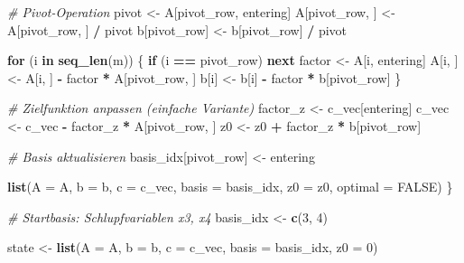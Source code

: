 \documentclass[
]{article}
\newenvironment{Shaded}{\begin{snugshade}}{\end{snugshade}}
\newcommand{\AttributeTok}[1]{\textcolor[rgb]{0.13,0.29,0.53}{#1}}
\newcommand{\CommentTok}[1]{\textcolor[rgb]{0.56,0.35,0.01}{\textit{#1}}}
\newcommand{\ConstantTok}[1]{\textcolor[rgb]{0.56,0.35,0.01}{#1}}
\newcommand{\ControlFlowTok}[1]{\textcolor[rgb]{0.13,0.29,0.53}{\textbf{#1}}}
\newcommand{\DecValTok}[1]{\textcolor[rgb]{0.00,0.00,0.81}{#1}}
\newcommand{\FunctionTok}[1]{\textcolor[rgb]{0.13,0.29,0.53}{\textbf{#1}}}
\newcommand{\NormalTok}[1]{#1}
\newcommand{\OtherTok}[1]{\textcolor[rgb]{0.56,0.35,0.01}{#1}}
\newcommand{\SpecialCharTok}[1]{\textcolor[rgb]{0.81,0.36,0.00}{\textbf{#1}}}
\begin{document}
\begin{Shaded}
\begin{Highlighting}[]
  \CommentTok{\# Pivot{-}Operation}
\NormalTok{  pivot }\OtherTok{\textless{}{-}}\NormalTok{ A[pivot\_row, entering]}
\NormalTok{  A[pivot\_row, ] }\OtherTok{\textless{}{-}}\NormalTok{ A[pivot\_row, ] }\SpecialCharTok{/}\NormalTok{ pivot}
\NormalTok{  b[pivot\_row]   }\OtherTok{\textless{}{-}}\NormalTok{ b[pivot\_row]   }\SpecialCharTok{/}\NormalTok{ pivot}

  \ControlFlowTok{for}\NormalTok{ (i }\ControlFlowTok{in} \FunctionTok{seq\_len}\NormalTok{(m)) \{}
    \ControlFlowTok{if}\NormalTok{ (i }\SpecialCharTok{==}\NormalTok{ pivot\_row) }\ControlFlowTok{next}
\NormalTok{    factor }\OtherTok{\textless{}{-}}\NormalTok{ A[i, entering]}
\NormalTok{    A[i, ] }\OtherTok{\textless{}{-}}\NormalTok{ A[i, ] }\SpecialCharTok{{-}}\NormalTok{ factor }\SpecialCharTok{*}\NormalTok{ A[pivot\_row, ]}
\NormalTok{    b[i]   }\OtherTok{\textless{}{-}}\NormalTok{ b[i]   }\SpecialCharTok{{-}}\NormalTok{ factor }\SpecialCharTok{*}\NormalTok{ b[pivot\_row]}
\NormalTok{  \}}

  \CommentTok{\# Zielfunktion anpassen (einfache Variante)}
\NormalTok{  factor\_z }\OtherTok{\textless{}{-}}\NormalTok{ c\_vec[entering]}
\NormalTok{  c\_vec }\OtherTok{\textless{}{-}}\NormalTok{ c\_vec }\SpecialCharTok{{-}}\NormalTok{ factor\_z }\SpecialCharTok{*}\NormalTok{ A[pivot\_row, ]}
\NormalTok{  z0    }\OtherTok{\textless{}{-}}\NormalTok{ z0 }\SpecialCharTok{+}\NormalTok{ factor\_z }\SpecialCharTok{*}\NormalTok{ b[pivot\_row]}

  \CommentTok{\# Basis aktualisieren}
\NormalTok{  basis\_idx[pivot\_row] }\OtherTok{\textless{}{-}}\NormalTok{ entering}

  \FunctionTok{list}\NormalTok{(}\AttributeTok{A =}\NormalTok{ A, }\AttributeTok{b =}\NormalTok{ b, }\AttributeTok{c =}\NormalTok{ c\_vec, }\AttributeTok{basis =}\NormalTok{ basis\_idx, }\AttributeTok{z0 =}\NormalTok{ z0,}
       \AttributeTok{optimal =} \ConstantTok{FALSE}\NormalTok{)}
\NormalTok{\}}


\CommentTok{\# Startbasis: Schlupfvariablen x3, x4}
\NormalTok{basis\_idx }\OtherTok{\textless{}{-}} \FunctionTok{c}\NormalTok{(}\DecValTok{3}\NormalTok{, }\DecValTok{4}\NormalTok{)}

\NormalTok{state }\OtherTok{\textless{}{-}} \FunctionTok{list}\NormalTok{(}\AttributeTok{A =}\NormalTok{ A, }\AttributeTok{b =}\NormalTok{ b, }\AttributeTok{c =}\NormalTok{ c\_vec,}
              \AttributeTok{basis =}\NormalTok{ basis\_idx, }\AttributeTok{z0 =} \DecValTok{0}\NormalTok{)}


\end{Highlighting}
\end{Shaded}
\end{document}
